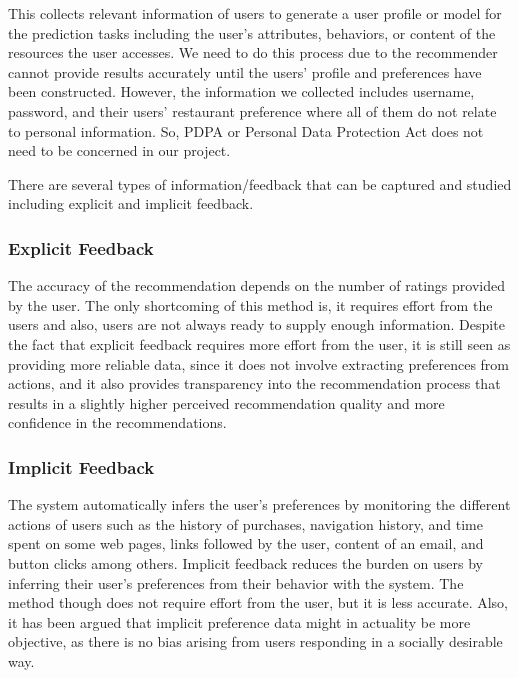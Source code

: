 \documentclass[12pt,oneside,openright,a4paper]{cpe-english-project}
\begin{document}
This collects relevant information of users to generate a user profile or model for the prediction tasks including the user’s attributes, behaviors, or content of the resources the user accesses. \cite{WhatisMachineLearning} We need to do this process due to the recommender cannot provide results accurately until the users’ profile and preferences have been constructed. However, the information we collected includes username, password, and their users’ restaurant preference where all of them do not relate to personal information. So, PDPA or Personal Data Protection Act does not need to be concerned in our project.

There are several types of information/feedback that can be captured and studied including explicit and implicit feedback.

\subsubsection{Explicit Feedback}

The accuracy of the recommendation depends on the number of ratings provided by the user. The only shortcoming of this method is, it requires effort from the users and also, users are not always ready to supply enough information. Despite the fact that explicit feedback requires more effort from the user, it is still seen as providing more reliable data, since it does not involve extracting preferences from actions, and it also provides transparency into the recommendation process that results in a slightly higher perceived recommendation quality and more confidence in the recommendations. \cite{Recommendersystem}

\subsubsection{Implicit Feedback}

The system automatically infers the user’s preferences by monitoring the different actions of users such as the history of purchases, navigation history, and time spent on some web pages, links followed by the user, content of an email, and button clicks among others. Implicit feedback reduces the burden on users by inferring their user’s preferences from their behavior with the system. The method though does not require effort from the user, but it is less accurate. Also, it has been argued that implicit preference data might in actuality be more objective, as there is no bias arising from users responding in a socially desirable way. \cite{Recommendersystem}
\end{document}
